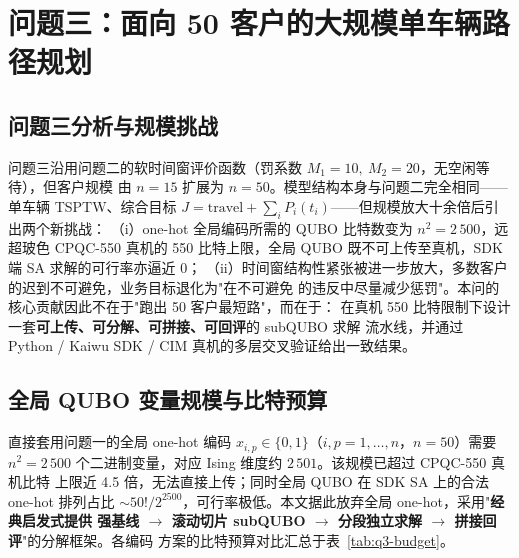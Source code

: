 \documentclass[UTF8,12pt,a4paper]{ctexart}
\begin{document}
\section{问题三：面向 50 客户的大规模单车辆路径规划}
\label{sec:q3}

\subsection{问题三分析与规模挑战}

问题三沿用问题二的软时间窗评价函数（罚系数 $M_1=10,\ M_2=20$，无空闲等待），但客户规模
由 $n=15$ 扩展为 $n=50$。模型结构本身与问题二完全相同——单车辆 TSPTW、综合目标
$J=\mathrm{travel}+\sum_i P_i(t_i)$——但规模放大十余倍后引出两个新挑战：
（i）one-hot 全局编码所需的 QUBO 比特数变为 $n^{2}=2\,500$，远超玻色 CPQC-550 真机的
550 比特上限，全局 QUBO 既不可上传至真机，SDK 端 SA 求解的可行率亦逼近 0；
（ii）时间窗结构性紧张被进一步放大，多数客户的迟到不可避免，业务目标退化为"在不可避免
的违反中尽量减少惩罚"。本问的核心贡献因此不在于"跑出 50 客户最短路"，而在于：
在真机 550 比特限制下设计一套\textbf{可上传、可分解、可拼接、可回评}的 subQUBO 求解
流水线，并通过 Python / Kaiwu SDK / CIM 真机的多层交叉验证给出一致结果。

\subsection{全局 QUBO 变量规模与比特预算}
\label{subsec:q3-budget}

直接套用问题一的全局 one-hot 编码 $x_{i,p}\in\{0,1\}$（$i,p=1,\dots,n$，$n=50$）需要
$n^{2}=2\,500$ 个二进制变量，对应 Ising 维度约 $2\,501$。该规模已超过 CPQC-550 真机比特
上限近 4.5 倍，无法直接上传；同时全局 QUBO 在 SDK SA 上的合法 one-hot 排列占比
$\sim 50!/2^{2500}$，可行率极低。本文据此放弃全局 one-hot，采用"\textbf{经典启发式提供
强基线 $\to$ 滚动切片 subQUBO $\to$ 分段独立求解 $\to$ 拼接回评}"的分解框架。各编码
方案的比特预算对比汇总于表~\ref{tab:q3-budget}。
\end{document}
